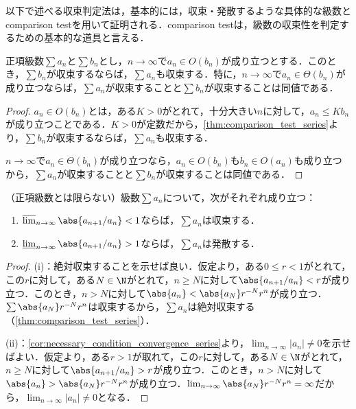 \documentclass[a4paper,10pt]{ltjsarticle}
\begin{document}
以下で述べる収束判定法は，基本的には，収束・発散するような具体的な級数とcomparison testを用いて証明される．comparison testは，級数の収束性を判定するための基本的な道具と言える．

\begin{MyCorollary}
  正項級数\(\sum a_n\)と\(\sum b_n\)とし，\(n\to\infty\)で\(a_n \in O(b_n)\)が成り立つとする．このとき，\(\sum b_n\)が収束するならば，\(\sum a_n\)も収束する．特に，\(n\to\infty\)で\(a_n \in \Theta(b_n)\)が成り立つならば，\(\sum a_n\)が収束することと\(\sum b_n\)が収束することは同値である．
\end{MyCorollary}
\begin{proof}
  \(a_n \in O(b_n)\)とは，ある\(K > 0\)がとれて，十分大きい\(n\)に対して，\(a_n \le Kb_n\)が成り立つことである．\(K > 0\)が定数だから，\cref{thm:comparison_test_series}より，\(\sum b_n\)が収束するならば，\(\sum a_n\)も収束する．

  \(n\to\infty\)で\(a_n \in \Theta(b_n)\)が成り立つなら，\(a_n \in O(b_n)\)も\(b_n \in O(a_n)\)も成り立つから，\(\sum a_n\)が収束することと\(\sum b_n\)が収束することは同値である．
\end{proof}

\begin{MyTheorem}
  （正項級数とは限らない）級数\(\sum a_n\)について，次がそれぞれ成り立つ：
  \begin{enumerate}
    \item \(\varlimsup_{n\to\infty}\abs{a_{n+1}/a_n} < 1\)ならば，\(\sum a_n\)は収束する．
    \item \(\varliminf_{n\to\infty}\abs{a_{n+1}/a_n} > 1\)ならば，\(\sum a_n\)は発散する．
  \end{enumerate}
\end{MyTheorem}
\begin{proof}
  (i)：絶対収束することを示せば良い．仮定より，ある\(0 \le r < 1\)がとれて，この\(r\)に対して，ある\(N \in \N\)がとれて，\(n \ge N\)に対して\(\abs{a_{n+1}/a_n} < r\)が成り立つ．このとき，\(n > N\)に対して\(\abs{a_n} < \abs{a_N}r^{-N}r^n\)が成り立つ．\(\sum \abs{a_N}r^{-N}r^n\)は収束するから，\(\sum a_n\)は絶対収束する（\cref{thm:comparison_test_series}）．

  (ii)：\cref{cor:necessary_condition_convergence_series}より，\(\lim_{n\to\infty}|a_n| \ne 0\)を示せばよい．仮定より，ある\(r > 1\)が取れて，この\(r\)に対して，ある\(N \in \N\)がとれて，\(n \ge N\)に対して\(\abs{a_{n+1}/a_n} > r\)が成り立つ．このとき，\(n > N\)に対して\(\abs{a_n} > \abs{a_N}r^{-N}r^n\)が成り立つ．\(\lim_{n\to\infty}\abs{a_N}r^{-N}r^n = \infty\)だから，\(\lim_{n\to\infty}|a_n| \ne 0\)となる．
\end{proof}
\end{document}
